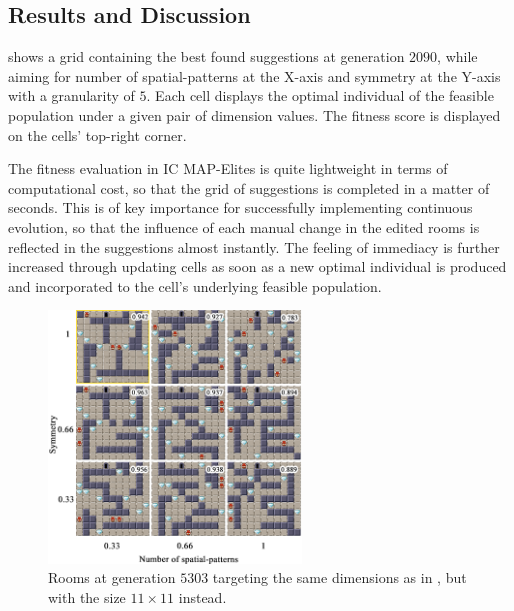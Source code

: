 \subsection{Results and Discussion\label{section:results}}
 shows a grid containing the best found suggestions at generation $2090$, while aiming for number of spatial-patterns at the X-axis and symmetry at the Y-axis with a granularity of $5$. Each cell displays the optimal individual of the feasible population under a given pair of dimension values. The fitness score is displayed on the cells' top-right corner.

The fitness evaluation in IC MAP-Elites is quite lightweight in terms of computational cost, so that the grid of suggestions is completed in a matter of seconds. This is of key importance for successfully implementing continuous evolution, so that the influence of each manual change in the edited rooms is reflected in the suggestions almost instantly. The feeling of immediacy is further increased through updating cells as soon as a new optimal individual is produced and incorporated to the cell’s underlying feasible population.

\begin{figure}[ht!]
\centerline{\includegraphics[width=0.6\textwidth]{figure5.png}}
\caption{Rooms at generation $5303$ targeting the same dimensions as in , but with the size $11\times11$ instead.}
\label{figs:patt_sym3}
\end{figure}

